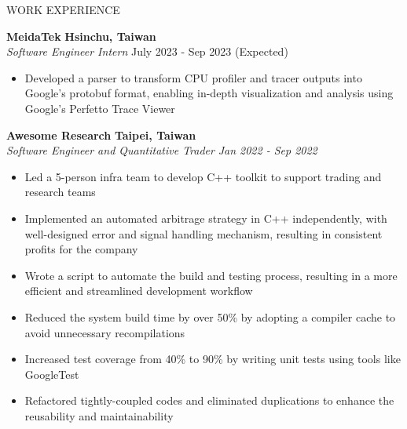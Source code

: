 \documentclass{resume} %
\begin{document}

\begin{rSection}{WORK EXPERIENCE} 

\textbf{MeidaTek} \hfill \textbf{Hsinchu, Taiwan} \\
\textit{Software Engineer Intern} \hfill {July 2023 - Sep 2023 (Expected)} 
\begin{itemize}
    \item Developed a parser to transform CPU profiler and tracer outputs into Google's protobuf format, enabling in-depth visualization and analysis using Google's Perfetto Trace Viewer
\end{itemize}

\textbf{Awesome Research} \hfill \textbf{Taipei, Taiwan} \\  
\textit{Software Engineer and Quantitative Trader}  \hfill \textit{Jan 2022 - Sep 2022} 
    \begin{itemize}
        \item Led a 5-person infra team to develop C++ toolkit to support trading and research teams 
        \item Implemented an automated arbitrage strategy in C++ independently, with well-designed error and signal handling mechanism, resulting in consistent profits for the company 
        \item Wrote a script to automate the build and testing process, resulting in a more efficient and streamlined development workflow
        \item Reduced the system build time by over 50\% by adopting a compiler cache to avoid unnecessary recompilations
        \item Increased test coverage from 40\% to 90\% by writing unit tests using tools like GoogleTest
        \item Refactored tightly-coupled codes and eliminated duplications to enhance the reusability and maintainability
    \end{itemize}




    
\end{rSection} 
\end{document}
